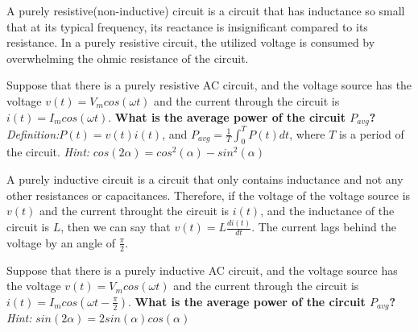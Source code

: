 


A purely resistive(non-inductive) circuit is a circuit that has inductance so small that at its typical frequency, its reactance is insignificant
compared to its resistance. In a purely resistive circuit, the utilized voltage is consumed by overwhelming the ohmic resistance of the circuit.

\begin{enumerate}

\qitem Suppose that there is a purely resistive AC circuit, and the voltage source has the voltage $v(t)=V_mcos(\omega t)$ and the current through
the circuit is $i(t)=I_mcos(\omega t)$. \textbf{What is the average power of the circuit $P_{avg}$?} \textit{Definition:}$P(t)=v(t)i(t)$, and $P_{avg}=\frac{1}{T}\int_{0}^{T}P(t)dt$,
where $T$ is a period of the circuit. \textit{Hint:} $cos(2\alpha)=cos^2(\alpha)-sin^2(\alpha)$

\ws{\vspace{80px}}

\end{enumerate}

A purely inductive circuit is a circuit that only contains inductance and not any other resistances or capacitances. Therefore, if the voltage of the voltage source
is $v(t)$ and the current throught the circuit is $i(t)$, and the inductance of the circuit is $L$, then we can say that $v(t)=L\frac{di(t)}{dt}$. The current lags behind the voltage 
by an angle of $\frac{\pi}{2}$.

\begin{enumerate}[resume]

\qitem Suppose that there is a purely inductive AC circuit, and the voltage source has the voltage $v(t)=V_mcos(\omega t)$ and the current through
the circuit is $i(t)=I_mcos(\omega t-\frac{\pi}{2})$. \textbf{What is the average power of the circuit $P_{avg}$?} \textit{Hint:} $sin(2\alpha)=2sin(\alpha)cos(\alpha)$

\ws{\vspace{80px}}

\end{enumerate}


